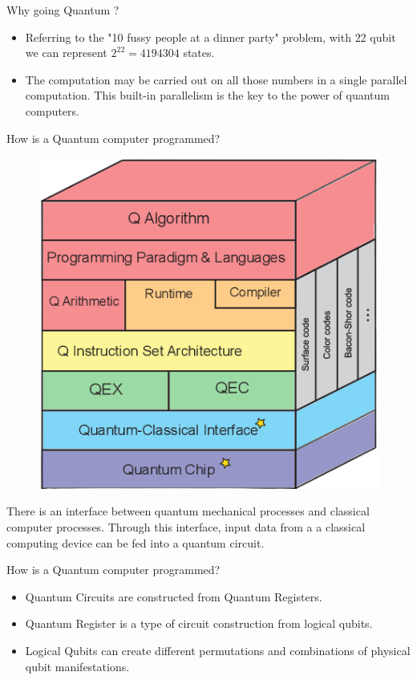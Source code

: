 \begin{frame}{Why going Quantum ?}
\begin{itemize}
 \item Referring to the "10 fussy people at a dinner party" problem, with \alert{22 qubit} we can represent $2^{22} = 4194304$ states.
    \item The computation may be carried out on all those numbers in a \alert{single parallel computation}. This built-in parallelism is the key to the power of quantum computers.
\end{itemize}
    
\end{frame}


\begin{frame}{How is a Quantum computer programmed?}
\begin{figure}[H]
    \centering
    \includegraphics[width=.4\linewidth]{ Hto8a.png}
\end{figure}
There is an \alert{interface} between quantum mechanical processes and classical computer processes. Through this interface, input data from a a classical computing device can be fed into a quantum circuit.
\end{frame}

\begin{frame}{How is a Quantum computer programmed?}
    \begin{itemize}
        \item \alert{Quantum Circuits} are constructed from Quantum Registers.
        \item \alert{Quantum Register} is a type of circuit construction from logical qubits. 
        \item \alert{Logical Qubits} can create different permutations and combinations of physical qubit manifestations.
    \end{itemize}
\end{frame}

